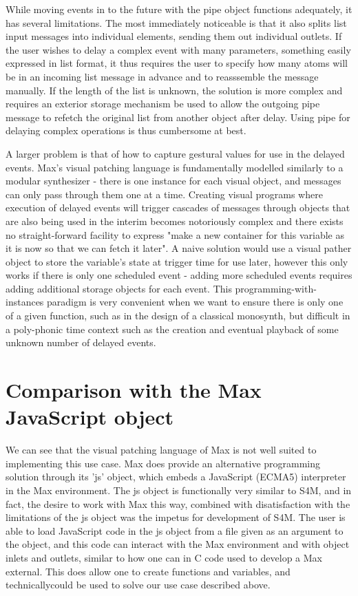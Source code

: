 \documentclass[acmsmall]{acmart}
\begin{document}
While moving events in to the future with the pipe object functions adequately, 
it has several limitations. The most immediately noticeable is that it also splits 
list input messages into individual elements, sending them out individual outlets. 
If the user wishes to delay a complex event with many parameters, something easily 
expressed in list format, it thus requires the user to specify how many atoms will 
be in an incoming list message in advance and to reasssemble the message manually.
If the length of the list is unknown, the solution is more complex and requires 
an exterior storage mechanism be used to allow the outgoing 
pipe message to refetch the original list from another object after delay. Using
pipe for delaying complex operations is thus cumbersome at best. 

A larger problem is that of how to capture gestural values for use in the delayed
events. Max's visual patching language is fundamentally modelled similarly to a modular
synthesizer - there is one instance for each visual object, and messages can only
pass through them one at a time. Creating visual programs where execution of 
delayed events will trigger cascades of messages through objects that are also 
being used in the interim becomes notoriously complex and there exists no straight-forward
facility to express "make a new container for this variable as it is now so that
we can fetch it later". A naive solution would use a visual pather object to store 
the variable's state at trigger time for use later, however this only works
if there is only one scheduled event - adding more scheduled events requires adding
additional storage objects for each event. This programming-with-instances paradigm
is very convenient when we want to ensure there is only one of a given function, such
as in the design of a classical monosynth, but difficult in a poly-phonic time context
such as the creation and eventual playback of some unknown number of delayed events.


\section{Comparison with the Max JavaScript object}
We can see that the visual patching language of Max is not well suited to implementing
this use case. Max does provide an alternative programming solution through its
'js' object, which embeds a JavaScript (ECMA5) interpreter in the Max environment.
The js object is functionally very similar to S4M, and in fact, the desire to 
work with Max this way, combined with disatisfaction with the limitations of the js
object was the impetus for development of S4M. The user is able to load JavaScript
code in the js object from a file given as an argument to the object,
and this code can interact with the Max environment and with object inlets and outlets,
similar to how one can in C code used to develop a Max external.
This does allow one to create functions and variables, and technicallycould be used to solve
our use case described above.
\end{document}

